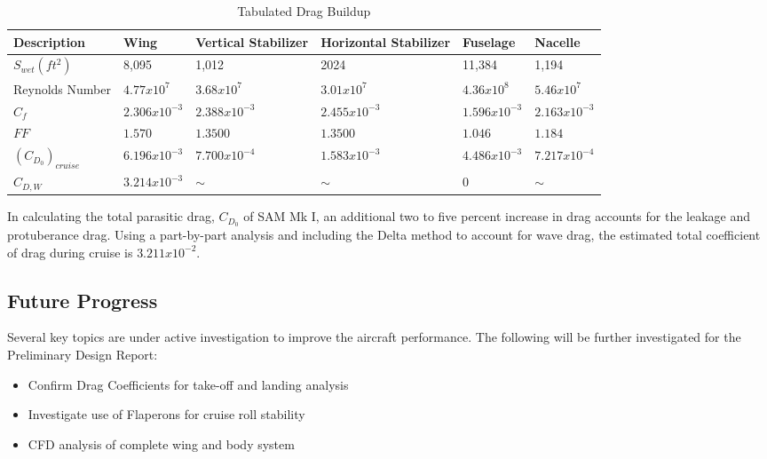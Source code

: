 \begin{table}[!h]
    \centering
    \caption{Tabulated Drag Buildup}
    \begin{tabular}{|p{0.75in}|p{0.75in}|p{0.75in}|p{0.75in}|p{0.75in}|p{0.75in}|}\toprule
        \textbf{Description} & \textbf{Wing} & \textbf{Vertical \newline Stabilizer} & \textbf{Horizontal \newline Stabilizer} & \textbf{Fuselage} & \textbf{Nacelle}  \\ \midrule
        $S_{wet} (ft^2)$ & 8,095 & 1,012 & 2024 & 11,384 & 1,194 \\ \hline
        Reynolds Number & $4.77x10^7$ & $3.68x10^7$ & $3.01x10^7$ & $4.36 x 10^8$ & $5.46 x 10^7$ \\ \hline
        $C_{f}$ & $2.306 x 10^{-3}$ & $2.388 x 10^{-3}$ & $2.455 x 10^{-3}$ & $1.596 x 10^{-3}$ & $2.163 x 10^{-3}$ \\ \hline
        $FF$ & $1.570$ & $1.3500$ & $1.3500$ & $1.046$ & $1.184$ \\ \hline
        \textbf{$(C_{D_{0}})_{cruise}$} & $6.196 x 10^{-3}$ & $7.700 x 10^{-4}$ & $1.583 x 10^{-3}$ & $4.486 x 10^{-3}$ & $7.217x10^{-4}$ \\ \midrule
        \textbf{$C_{D,W}$} & $3.214 x 10^{-3}$ & $\sim$ & $\sim$ & 0 & $\sim$ \\ \hline
        
    \end{tabular}
    \label{tab:dragbuildup}
\end{table}

In calculating the total parasitic drag, $C_{D_{0}}$ of SAM Mk I, an additional two to five percent increase in drag accounts for the leakage and protuberance drag. \cite{raymer}  Using a part-by-part analysis and including the Delta method to account for wave drag, the estimated total coefficient of drag during cruise is $3.211 x 10^{-2}$.




\subsection{Future Progress}
Several key topics are under active investigation to improve the aircraft performance. The following will be further investigated for the Preliminary Design Report:
\begin{itemize}
    \item Confirm Drag Coefficients for take-off and landing analysis
    \item Investigate use of Flaperons for cruise roll stability
    \item CFD analysis of complete wing and body system
\end{itemize}


